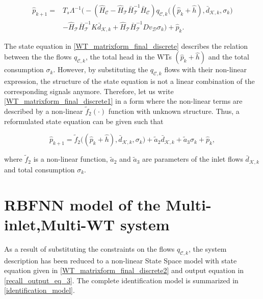 \vspace{-4mm}
\begin{align}
\label{WT_matrixform_final_discrete1}
\nonumber  \hat{p}_{k+1}  =& T_s \Lambda^{-1} \big(- (\hat{H}_{\mathcal{C}} - \hat{H}_{\mathcal{T}} \bar{H}^{-1}_{\mathcal{T}}\bar{H}_{\mathcal{C}})  q_{\mathcal{C},k}\big ((\hat{p}_k + \hat{h}),\bar{d}_{\mathcal{K},k}, \sigma_k \big) \\ & - \hat{H}_{\mathcal{T}} \bar{H}^{-1}_{\mathcal{T}} K \bar{d}_{\mathcal{K},k} + \hat{H}_{\mathcal{T}} \bar{H}^{-1}_{\mathcal{T}} D v_{\mathcal{D}} \sigma_k \big) + \hat{p}_k .
\end{align}
\vspace{-4mm}


The state equation in \eqref{WT_matrixform_final_discrete} describes the relation between the the flows $q_{\mathcal{C},k}$, the total head in the WTs $(\hat{p}_k + \hat{h})$ and the total consumption $\sigma_k$. However, by substituting the $q_{\mathcal{C},k}$ flows with their non-linear expression, the structure of the state equation is not a linear combination of the corresponding signals anymore. Therefore, let us write \eqref{WT_matrixform_final_discrete1} in a form where the non-linear terms are described by a non-linear $\tilde{f}_2(\cdot)$ function with unknown structure. Thus, a reformulated state equation can be given such that

 \begin{equation}
  \label{WT_matrixform_final_discrete2}
     \hat{p}_{k+1}  = \tilde{f}_2 \big((\hat{p}_k + \hat{h}),\bar{d}_{\mathcal{K},k}, \sigma_k\big) + \tilde{a}_2 \bar{d}_{\mathcal{K},k} + \tilde{a}_3 \sigma_k + \hat{p}_k,
\end{equation} 


where $\tilde{f}_2$ is a non-linear function, $\tilde{a}_2$ and $\tilde{a}_3$ are parameters of the inlet flows $\bar{d}_{\mathcal{K},k}$ and total consumption $\sigma_k$. 


\section{RBFNN model of the Multi-inlet,Multi-WT system}
\label{RBFNN_model_multi_inlet_multi_WT_sys} 

As a result of substituting the constraints on the flows $q_{\mathcal{C},k}$, the system description has been reduced to a non-linear State Space model with state equation given in \eqref {WT_matrixform_final_discrete2} and output equation in \eqref {recall_output_eq_3}. The complete identification model is summarized in \eqref{identification_model}. 

